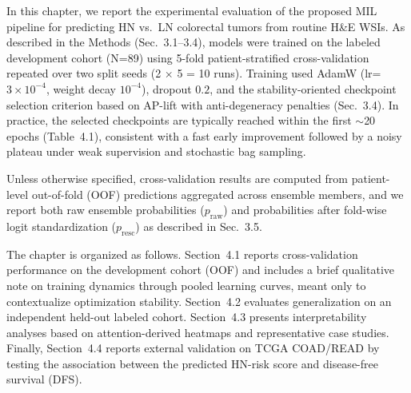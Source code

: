 

In this chapter, we report the experimental evaluation of the proposed MIL pipeline for predicting HN vs.\ LN colorectal tumors from routine H\&E WSIs. As described in the Methods (Sec.~3.1--3.4), models were trained on the labeled development cohort (N=89) using 5-fold patient-stratified cross-validation repeated over two split seeds (2 $\times$ 5 = 10 runs). Training used AdamW (lr=$3\times10^{-4}$, weight decay $10^{-4}$), dropout $0.2$, and the stability-oriented checkpoint selection criterion based on AP-lift with anti-degeneracy penalties (Sec.~3.4). In practice, the selected checkpoints are typically reached within the first $\sim$20 epochs (Table~4.1), consistent with a fast early improvement followed by a noisy plateau under weak supervision and stochastic bag sampling.

Unless otherwise specified, cross-validation results are computed from patient-level out-of-fold (OOF) predictions aggregated across ensemble members, and we report both raw ensemble probabilities ($p_{\mathrm{raw}}$) and probabilities after fold-wise logit standardization ($p_{\mathrm{resc}}$) as described in Sec.~3.5.

The chapter is organized as follows. Section~4.1 reports cross-validation performance on the development cohort (OOF) and includes a brief qualitative note on training dynamics through pooled learning curves, meant only to contextualize optimization stability. Section~4.2 evaluates generalization on an independent held-out labeled cohort. Section~4.3 presents interpretability analyses based on attention-derived heatmaps and representative case studies. Finally, Section~4.4 reports external validation on TCGA COAD/READ by testing the association between the predicted HN-risk score and disease-free survival (DFS).



